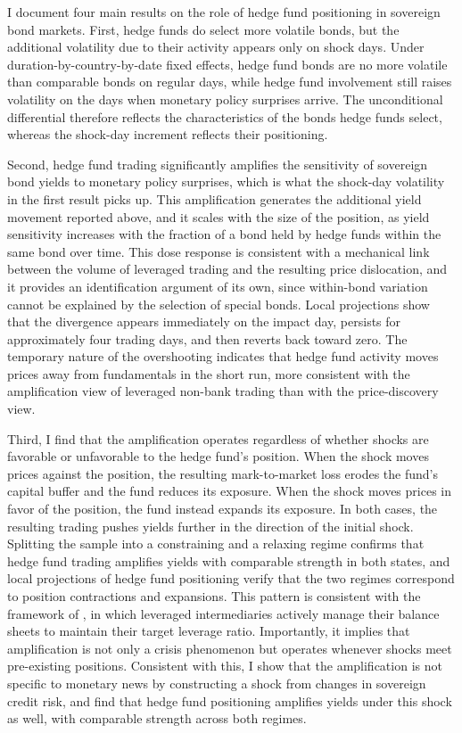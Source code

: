 \documentclass[english, 11pt, oneside]{article}
\begin{document}
I document four main results on the role of hedge fund positioning in sovereign bond markets. First, hedge funds do select more volatile bonds, but the additional volatility due to their activity appears only on shock days. Under duration-by-country-by-date fixed effects, hedge fund bonds are no more volatile than comparable bonds on regular days, while hedge fund involvement still raises volatility on the days when monetary policy surprises arrive. The unconditional differential therefore reflects the characteristics of the bonds hedge funds select, whereas the shock-day increment reflects their positioning.

Second, hedge fund trading significantly amplifies the sensitivity of sovereign bond yields to monetary policy surprises, which is what the shock-day volatility in the first result picks up. This amplification generates the additional yield movement reported above, and it scales with the size of the position, as yield sensitivity increases with the fraction of a bond held by hedge funds within the same bond over time. This dose response is consistent with a mechanical link between the volume of leveraged trading and the resulting price dislocation, and it provides an identification argument of its own, since within-bond variation cannot be explained by the selection of special bonds. Local projections show that the divergence appears immediately on the impact day, persists for approximately four trading days, and then reverts back toward zero. The temporary nature of the overshooting indicates that hedge fund activity moves prices away from fundamentals in the short run, more consistent with the amplification view of leveraged non-bank trading than with the price-discovery view.

Third, I find that the amplification operates regardless of whether shocks are favorable or unfavorable to the hedge fund's position. When the shock moves prices against the position, the resulting mark-to-market loss erodes the fund's capital buffer and the fund reduces its exposure. When the shock moves prices in favor of the position, the fund instead expands its exposure. In both cases, the resulting trading pushes yields further in the direction of the initial shock. Splitting the sample into a constraining and a relaxing regime confirms that hedge fund trading amplifies yields with comparable strength in both states, and local projections of hedge fund positioning verify that the two regimes correspond to position contractions and expansions. This pattern is consistent with the framework of \citet{adrian2014}, in which leveraged intermediaries actively manage their balance sheets to maintain their target leverage ratio. Importantly, it implies that amplification is not only a crisis phenomenon but operates whenever shocks meet pre-existing positions. Consistent with this, I show that the amplification is not specific to monetary news by constructing a shock from changes in sovereign credit risk, and find that hedge fund positioning amplifies yields under this shock as well, with comparable strength across both regimes.
\end{document}
